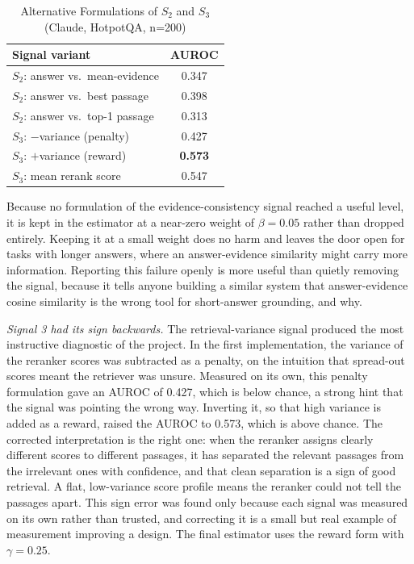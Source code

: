 \documentclass[conference,a4paper,10pt]{IEEEtran}
\begin{document}
\begin{table}[t]
\centering
\caption{Alternative Formulations of $S_2$ and $S_3$ (Claude, HotpotQA, n=200)}
\label{tab:altsignal}
\renewcommand{\arraystretch}{1.2}
\begin{tabular}{lc}
\toprule
\textbf{Signal variant} & \textbf{AUROC} \\
\midrule
$S_2$: answer vs.\ mean-evidence & 0.347 \\
$S_2$: answer vs.\ best passage & 0.398 \\
$S_2$: answer vs.\ top-1 passage & 0.313 \\
$S_3$: $-$variance (penalty) & 0.427 \\
$S_3$: $+$variance (reward) & \textbf{0.573} \\
$S_3$: mean rerank score & 0.547 \\
\bottomrule
\end{tabular}
\end{table}

Because no formulation of the evidence-consistency signal reached a useful level, it is
kept in the estimator at a near-zero weight of $\beta = 0.05$ rather than dropped
entirely. Keeping it at a small weight does no harm and leaves the door open for tasks
with longer answers, where an answer-evidence similarity might carry more information.
Reporting this failure openly is more useful than quietly removing the signal, because it
tells anyone building a similar system that answer-evidence cosine similarity is the wrong
tool for short-answer grounding, and why.

\textit{Signal 3 had its sign backwards.}
The retrieval-variance signal produced the most instructive diagnostic of the project. In
the first implementation, the variance of the reranker scores was subtracted as a penalty,
on the intuition that spread-out scores meant the retriever was unsure. Measured on its
own, this penalty formulation gave an AUROC of 0.427, which is below chance, a strong hint
that the signal was pointing the wrong way. Inverting it, so that high variance is added
as a reward, raised the AUROC to 0.573, which is above chance. The corrected
interpretation is the right one: when the reranker assigns clearly different scores to
different passages, it has separated the relevant passages from the irrelevant ones with
confidence, and that clean separation is a sign of good retrieval. A flat, low-variance
score profile means the reranker could not tell the passages apart. This sign error was
found only because each signal was measured on its own rather than trusted, and correcting
it is a small but real example of measurement improving a design. The final estimator uses
the reward form with $\gamma = 0.25$.
\end{document}
